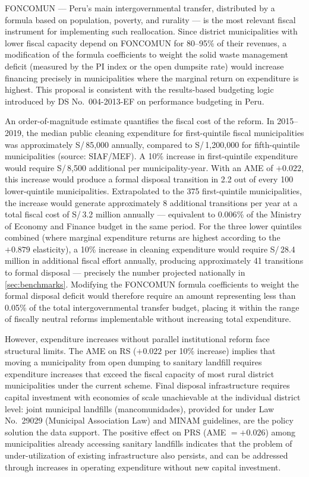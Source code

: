 FONCOMUN --- Peru's main intergovernmental transfer, distributed by a formula based on population, poverty, and rurality --- is the most relevant fiscal instrument for implementing such reallocation. Since district municipalities with lower fiscal capacity depend on FONCOMUN for 80--95\% of their revenues, a modification of the formula coefficients to weight the solid waste management deficit (measured by the PI index or the open dumpsite rate) would increase financing precisely in municipalities where the marginal return on expenditure is highest. This proposal is consistent with the results-based budgeting logic introduced by DS No.\ 004-2013-EF on performance budgeting in Peru.

An order-of-magnitude estimate quantifies the fiscal cost of the reform.
In 2015--2019, the median public cleaning expenditure for first-quintile fiscal municipalities was approximately S/\,85,000 annually, compared to S/\,1,200,000 for fifth-quintile municipalities (source: SIAF/MEF).
A 10\% increase in first-quintile expenditure would require S/\,8,500 additional per municipality-year.
With an AME of $+0.022$, this increase would produce a formal disposal transition in 2.2 out of every 100 lower-quintile municipalities.
Extrapolated to the 375 first-quintile municipalities, the increase would generate approximately 8 additional transitions per year at a total fiscal cost of S/\,3.2 million annually --- equivalent to $0.006$\% of the Ministry of Economy and Finance budget in the same period.
For the three lower quintiles combined (where marginal expenditure returns are highest according to the $+0.879$ elasticity), a 10\% increase in cleaning expenditure would require S/\,28.4 million in additional fiscal effort annually, producing approximately 41 transitions to formal disposal --- precisely the number projected nationally in \cref{sec:benchmarks}.
Modifying the FONCOMUN formula coefficients to weight the formal disposal deficit would therefore require an amount representing less than 0.05\% of the total intergovernmental transfer budget, placing it within the range of fiscally neutral reforms implementable without increasing total expenditure.

However, expenditure increases without parallel institutional reform face structural limits. The AME on RS ($+0.022$ per 10\% increase) implies that moving a municipality from open dumping to sanitary landfill requires expenditure increases that exceed the fiscal capacity of most rural district municipalities under the current scheme. Final disposal infrastructure requires capital investment with economies of scale unachievable at the individual district level: joint municipal landfills (mancomunidades), provided for under Law No.\ 29029 (Municipal Association Law) and MINAM guidelines, are the policy solution the data support. The positive effect on PRS (AME $= +0.026$) among municipalities already accessing sanitary landfills indicates that the problem of under-utilization of existing infrastructure also persists, and can be addressed through increases in operating expenditure without new capital investment.

